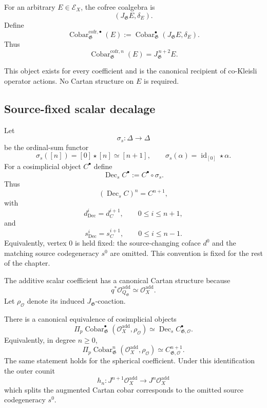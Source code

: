 \begin{definition}
\label{def:as-cofree-cobar}
For an arbitrary $E\in\mathcal E_X$, the cofree coalgebra is
\[
    (J_{\mathfrak G}E,\delta_E).
\]
Define
\[
\boxed{
    \operatorname{Cobar}^{\mathrm{cofr},\bullet}_{\mathfrak G}(E)
    :=
    \operatorname{Cobar}^{\bullet}_{\mathfrak G}
    (J_{\mathfrak G}E,\delta_E).
}
\]
Thus
\[
    \operatorname{Cobar}^{\mathrm{cofr},n}_{\mathfrak G}(E)
    =
    J_{\mathfrak G}^{\,n+2}E.
\]
\end{definition}

This object exists for every coefficient and is the canonical recipient of
co-Kleisli operator actions.  No Cartan structure on $E$ is required.

\subsection{Source-fixed scalar decalage}

\begin{definition}
\label{def:as-source-decalage}
Let
\[
    \sigma_s:\Delta\longrightarrow\Delta
\]
be the ordinal-sum functor
\[
    \sigma_s([n])=[0]\star[n]\simeq[n+1],
    \qquad
    \sigma_s(\alpha)=\operatorname{id}_{[0]}\star\alpha.
\]
For a cosimplicial object $C^\bullet$ define
\[
\boxed{
    \operatorname{Dec}_sC^\bullet
    :=C^\bullet\circ\sigma_s.}
\]
Thus
\[
    (\operatorname{Dec}_sC)^n=C^{n+1},
\]
with
\[
    d_{\operatorname{Dec}}^i=d_C^{i+1},
    \qquad 0\leq i\leq n+1,
\]
and
\[
    s_{\operatorname{Dec}}^i=s_C^{i+1},
    \qquad 0\leq i\leq n-1.
\]
Equivalently, vertex $0$ is held fixed: the source-changing coface $d^0$ and
the matching source codegeneracy $s^0$ are omitted.  This convention is fixed
for the rest of the chapter.
\end{definition}

The additive scalar coefficient has a canonical Cartan structure because
\[
    q^*\mathcal O_{Q_{\mathfrak G}}^{\mathrm{add}}
    \simeq
    \mathcal O_X^{\mathrm{add}}.
\]
Let $\rho_{\mathcal O}$ denote its induced $J_{\mathfrak G}$-coaction.

\begin{theorem}
\label{thm:as-scalar-decalage}
There is a canonical equivalence of cosimplicial objects
\[
\boxed{
    \Pi_p
    \operatorname{Cobar}_{\mathfrak G}^{\bullet}
    (\mathcal O_X^{\mathrm{add}},\rho_{\mathcal O})
    \simeq
    \operatorname{Dec}_s
    C_{\mathfrak G,\mathcal O}^{\bullet}.}
\]
Equivalently, in degree $n\geq0$,
\[
    \Pi_p
    \operatorname{Cobar}_{\mathfrak G}^{n}
    (\mathcal O_X^{\mathrm{add}},\rho_{\mathcal O})
    \simeq
    C_{\mathfrak G,\mathcal O}^{n+1}.
\]
The same statement holds for the spherical coefficient.  Under this
identification the outer counit
\[
    h_n:J^{n+1}\mathcal O_X^{\mathrm{add}}\to
    J^n\mathcal O_X^{\mathrm{add}}
\]
which splits the augmented Cartan cobar corresponds to the omitted
source codegeneracy $s^0$.
\end{theorem}

